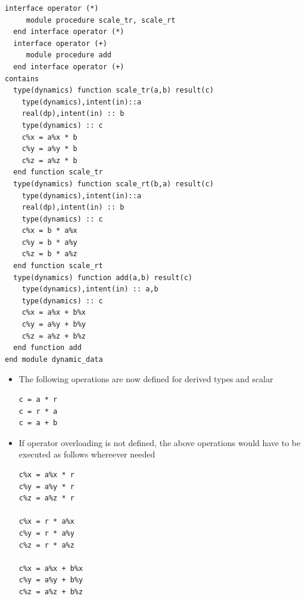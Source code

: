 \documentclass[10pt,t]{beamer}
\begin{document}
\begin{frame}
\begin{lstlisting}[language={[90]Fortran},basicstyle=\fontsize{5}{6}\selectfont\ttfamily,multicols=2]
  interface operator (*)
     module procedure scale_tr, scale_rt
  end interface operator (*)
  interface operator (+)
     module procedure add
  end interface operator (+)
contains
  type(dynamics) function scale_tr(a,b) result(c)
    type(dynamics),intent(in)::a
    real(dp),intent(in) :: b
    type(dynamics) :: c
    c%x = a%x * b
    c%y = a%y * b
    c%z = a%z * b
  end function scale_tr
  type(dynamics) function scale_rt(b,a) result(c)
    type(dynamics),intent(in)::a
    real(dp),intent(in) :: b
    type(dynamics) :: c
    c%x = b * a%x
    c%y = b * a%y
    c%z = b * a%z
  end function scale_rt
  type(dynamics) function add(a,b) result(c)
    type(dynamics),intent(in) :: a,b
    type(dynamics) :: c
    c%x = a%x + b%x
    c%y = a%y + b%y
    c%z = a%z + b%z
  end function add
end module dynamic_data
  \end{lstlisting}
  \begin{itemize}
    \item The following operations are now defined for derived types  and scalar 
      \begin{lstlisting}[language={[90]Fortran},basicstyle=\fontsize{7}{8}\selectfont\ttfamily]
c = a * r
c = r * a
c = a + b
      \end{lstlisting}
    \item If operator overloading is not defined, the above operations would have to be executed as follows whereever needed
      \begin{lstlisting}[language={[90]Fortran},basicstyle=\fontsize{7}{8}\selectfont\ttfamily]
c%x = a%x * r
c%y = a%y * r
c%z = a%z * r

c%x = r * a%x
c%y = r * a%y
c%z = r * a%z

c%x = a%x + b%x
c%y = a%y + b%y
c%z = a%z + b%z 
      \end{lstlisting}
  \end{itemize}
\end{frame}
\end{document}
